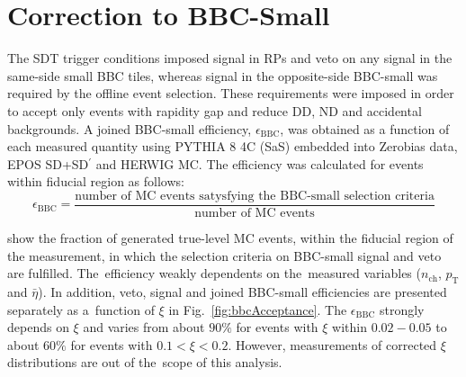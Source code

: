 \section{Correction to BBC-Small }\label{section:star_bbc}
The SDT trigger conditions imposed signal in RPs and veto on any signal in the same-side small BBC tiles, whereas signal in the opposite-side BBC-small was required by the offline event selection. These requirements were imposed in order to accept only events with rapidity gap and reduce \ac{DD}, \ac{ND} and accidental backgrounds.  A joined BBC-small efficiency, $\epsilon_\textrm{BBC}$, was obtained as a function of each measured quantity using  PYTHIA 8 4C (SaS) embedded into Zerobias data, EPOS SD+SD$^\prime$ and HERWIG \ac{MC}. 
The efficiency was calculated  for events within fiducial region as follows:
\begin{equation}
\epsilon_\textrm{BBC}=\frac{\textrm{number of MC events satysfying the BBC-small selection criteria}}{\textrm{number of MC events}}
\end{equation}




 show the fraction of generated true-level MC events, within the fiducial region of the measurement, in which the selection criteria on BBC-small signal and veto are fulfilled. The~efficiency  weakly dependents on the~measured variables ($n_\textrm{ch}$, $p_\textrm{T}$ and $\bar{\eta}$).
In addition, veto, signal and joined BBC-small efficiencies are presented separately as a~function of $\xi$ in Fig.~\ref{fig:bbcAcceptance}. The $\epsilon_\textrm{BBC}$  strongly depends on $\xi$ and varies from about $90\%$ for events with $\xi$ within $0.02-0.05$ to about $60\%$ for events with $0.1<\xi<0.2$. However, measurements of corrected $\xi$ distributions are out of the~scope of this analysis.

